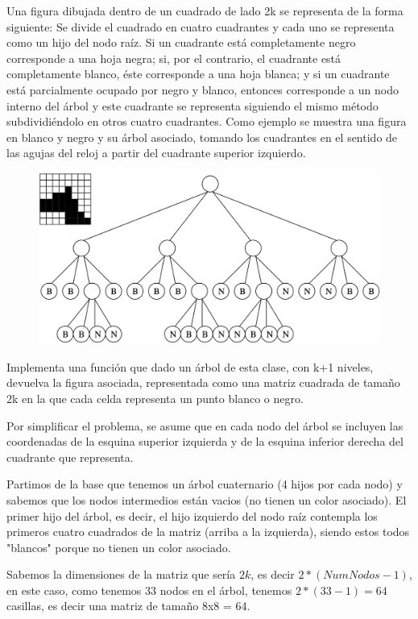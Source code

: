 Una figura dibujada dentro de un cuadrado de lado 2k se representa de la forma siguiente: Se divide el cuadrado en cuatro cuadrantes y cada uno se representa como un hijo del nodo raíz. Si un cuadrante está completamente negro corresponde a una hoja negra; si, por el contrario, el cuadrante está completamente blanco, éste corresponde a una hoja blanca; y si un cuadrante está parcialmente ocupado por negro y blanco, entonces corresponde a un nodo interno del árbol y este cuadrante se representa siguiendo el mismo método subdividiéndolo en otros cuatro cuadrantes. Como ejemplo se muestra una figura en blanco y negro y su árbol asociado, tomando los cuadrantes en el sentido de las agujas del reloj a partir del cuadrante superior izquierdo.
\begin{figure}[h]
  \begin{center}
    \includegraphics[width=.7\textwidth]{assets/p5.png}
  \end{center}
\end{figure}

Implementa una función que dado un árbol de esta clase, con k+1 niveles, devuelva la figura asociada, representada como una matriz cuadrada de tamaño 2k en la que cada celda representa un punto blanco o negro.

 Por simplificar el problema, se asume que en cada nodo del árbol se incluyen las coordenadas de la esquina superior izquierda y de la esquina inferior derecha del cuadrante que representa.

Partimos de la base que tenemos un árbol cuaternario (4 hijos por cada nodo) y sabemos que los nodos intermedios están vacios (no tienen un color asociado).
El primer hijo del árbol, es decir, el hijo izquierdo del nodo raíz contempla los primeros cuatro cuadrados de la matriz (arriba a la izquierda), siendo estos todos "blancos" porque no tienen un color asociado.

Sabemos la dimensiones de la matriz que sería \(2k\), es decir \(2*(NumNodos-1)\), en este caso, como tenemos 33 nodos en el árbol, tenemos \(2*(33-1) = 64\) casillas, es decir una matriz de tamaño 8x8 = 64.

